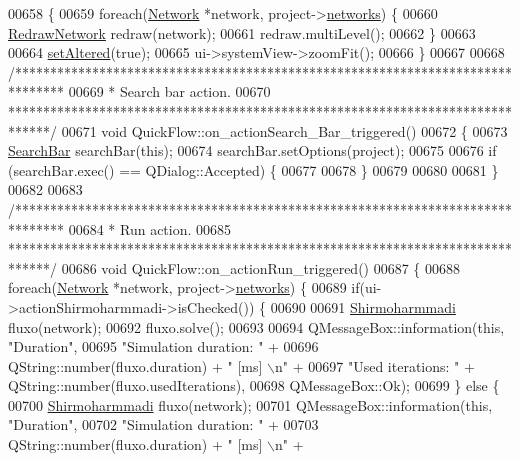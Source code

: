 \begin{DoxyCode}
00658 \{
00659   \textcolor{keywordflow}{foreach}(\hyperlink{class_network}{Network} *network, project->\hyperlink{class_project_aa98126154cab59769a431668e6f17daf}{networks}) \{
00660     \hyperlink{class_redraw_network}{RedrawNetwork} redraw(network);
00661     redraw.multiLevel();
00662   \}
00663 
00664   \hyperlink{group___window_ga4b63ea5ca52a9eea14db0a22b5a133f8}{setAltered}(\textcolor{keyword}{true});
00665   ui->systemView->zoomFit();
00666 \}
00667 
00668 \textcolor{comment}{/*******************************************************************************}
00669 \textcolor{comment}{ * Search bar action.}
00670 \textcolor{comment}{ ******************************************************************************/}
00671 \textcolor{keywordtype}{void} QuickFlow::on\_actionSearch\_Bar\_triggered()
00672 \{
00673   \hyperlink{class_search_bar}{SearchBar} searchBar(\textcolor{keyword}{this});
00674   searchBar.setOptions(project);
00675 
00676   \textcolor{keywordflow}{if} (searchBar.exec() == QDialog::Accepted) \{
00677 
00678   \}
00679 
00680 
00681 \}
00682 
00683 \textcolor{comment}{/*******************************************************************************}
00684 \textcolor{comment}{ * Run action.}
00685 \textcolor{comment}{ ******************************************************************************/}
00686 \textcolor{keywordtype}{void} QuickFlow::on\_actionRun\_triggered()
00687 \{
00688   \textcolor{keywordflow}{foreach}(\hyperlink{class_network}{Network} *network, project->\hyperlink{class_project_aa98126154cab59769a431668e6f17daf}{networks}) \{
00689     \textcolor{keywordflow}{if}(ui->actionShirmoharmmadi->isChecked()) \{
00690 
00691       \hyperlink{class_shirmoharmmadi}{Shirmoharmmadi} fluxo(network);
00692       fluxo.solve();
00693 
00694       QMessageBox::information(\textcolor{keyword}{this}, \textcolor{stringliteral}{"Duration"},
00695                                \textcolor{stringliteral}{"Simulation duration: "} +
00696                                QString::number(fluxo.duration) + \textcolor{stringliteral}{" [ms] \(\backslash\)n"} +
00697                                \textcolor{stringliteral}{"Used iterations: "} + QString::number(fluxo.usedIterations),
00698                                QMessageBox::Ok);
00699     \} \textcolor{keywordflow}{else} \{
00700       \hyperlink{class_shirmoharmmadi}{Shirmoharmmadi} fluxo(network);
00701       QMessageBox::information(\textcolor{keyword}{this}, \textcolor{stringliteral}{"Duration"},
00702                                \textcolor{stringliteral}{"Simulation duration: "} +
00703                                QString::number(fluxo.duration) + \textcolor{stringliteral}{" [ms] \(\backslash\)n"} +

\end{DoxyCode}
